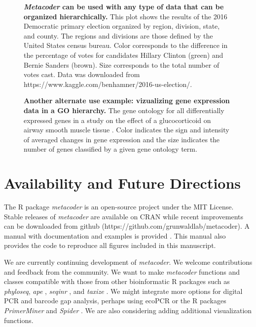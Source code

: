 \documentclass[10pt,letterpaper]{article}
\begin{document}
\begin{figure}[!h]
\caption{{\bf \emph{Metacoder} can be used with any type of data that
		can be organized hierarchically.}
This plot shows the results of the
2016 Democratic primary election organized by region, division, state,
and county. The regions and divisions are those defined by the United
States census bureau. Color corresponds to the difference in the
percentage of votes for candidates Hillary Clinton (green) and Bernie
Sanders (brown). Size corresponds to the total number of votes cast.
Data was downloaded from
https://www.kaggle.com/benhamner/2016-us-election/.}
\label{fig6}
\end{figure}


\begin{figure}[!h]
	\caption{{\bf  Another alternate use example: vizualizing gene
			expression data in a GO hierarchy.}
		The gene ontology for all
		differentially expressed genes in a study on the effect of a
		glucocorticoid on airway smooth muscle tissue \cite{himes2014rna}. Color
		indicates the sign and intensity of averaged changes in gene expression
		and the size indicates the number of genes classified by a given gene
		ontology term.}
	\label{fig7}
\end{figure}

\section*{Availability and Future
	Directions}\label{availability-and-future-directions}

The R package \emph{metacoder} is an open-source project under the MIT
License. Stable releases of \emph{metacoder} are available on CRAN while
recent improvements can be downloaded from github
(https://github.com/grunwaldlab/metacoder). A manual with documentation
and examples is provided \cite{foster2016metacoder_manual}. This manual
also provides the code to reproduce all figures included in this
manuscript.

We are currently continuing development of \emph{metacoder}. We welcome
contributions and feedback from the community. We want to make
\emph{metacoder} functions and classes compatible with those from other
bioinformatic R packages such as \emph{phyloseq}, \emph{ape}
\cite{paradis2004ape}, \emph{seqinr} \cite{charif2007seqinr}, and
\emph{taxize} \cite{chamberlain2013taxize}. We might integrate more
options for digital PCR and barcode gap analysis, perhaps using ecoPCR
\cite{ficetola2010silico} or the R packages \emph{PrimerMiner}
\cite{elbrecht2016primerminer} and \emph{Spider} \cite{brown2012spider}.
We are also considering adding additional visualization functions.
\end{document}
